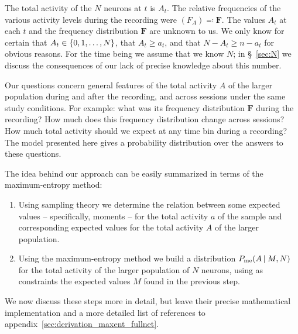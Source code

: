 \documentclass[\ifafour a4paper,12pt,\else a5paper,10pt,\fi%
onecolumn,oneside,article,%
british%
]{memoir}
\theoremstyle{remark}
\theoremstyle{innote}
\newcommand*{\defs}{\eqqcolon}
\renewcommand*{\ge}{\geqslant}%
\DeclarePairedDelimiter\set{\{}{\}}
\renewcommand*{\|}{\nonscript\,\vert\nonscript\;\mathopen{}}
\newcommand*{\sect}{\S}%
\newcommand*{\yAv}{A}
\newcommand*{\yav}{a}
\newcommand*{\yFF}{F}
\newcommand*{\yF}{\bm{\yFF}}
\newcommand*{\ya}{\yav}%
\newcommand*{\yA}{\yAv}%
\newcommand*{\px}{P_{\text{me}}}
\begin{document}
The total activity of the $N$ neurons at $t$ is $\yA_{t}$. The relative
frequencies of the various activity levels during the recording were
$(\yFF_{\yA}) \defs \yF$. The values $\yA_{t}$ at each $t$ and
the frequency distribution $\yF$ are unknown to us. We only know for certain that
$\yA_{t} \in \set{0, 1, \dotsc, N}$, that $\yA_{t} \ge \ya_{t}$, and that
$N-\yA_{t} \ge n-\ya_{t}$ for obvious reasons. For the time being we assume
that we know $N$; in \sect~\ref{sec:N} we discuss the consequences of our
lack of precise knowledge about this number.

Our questions concern general features of the total activity $\yA$ of the
larger population during and after the recording, and across sessions under
the same study conditions. For example: what was its frequency distribution
$\yF$ during the recording? How much does this frequency distribution
change across sessions? How much total activity should we expect at any
time bin during a recording? The model presented here gives a probability
distribution over the answers to these questions.


\bigskip

The idea behind our approach can be easily summarized in terms of the
maximum-entropy method:
\begin{enumerate}[label=(\alph*)]
\item\label{item:sample_step} Using sampling theory we determine the
  relation between some expected values -- specifically, moments -- for the
  total activity $\ya$ of the sample and corresponding expected values %
  for the total activity $\yA$ of the larger population.
\item\label{item:maxent_step} Using the maximum-entropy method we build a
  distribution $\px(\yA \| M, N)$ for the total activity of the larger
  population of $N$ neurons, using as constraints the expected values $M$
  found in the previous step.
\end{enumerate}
We now discuss these steps more in detail, but leave their precise
mathematical implementation and a more detailed list of references to
appendix~\ref{sec:derivation_maxent_fullnet}.

\medskip
\end{document}
